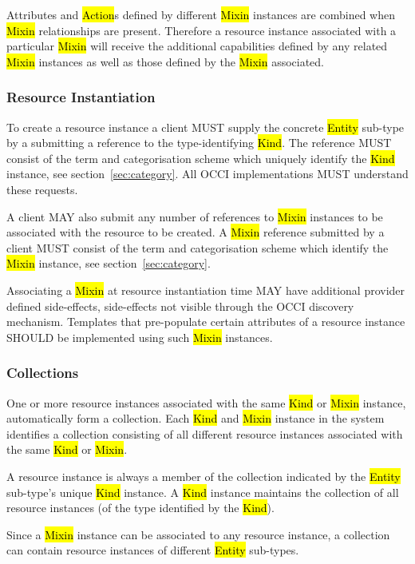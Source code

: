 \documentclass[10pt,a4paper]{article}
\begin{document}
Attributes and \hl{Action}s defined by different \hl{Mixin} instances
are combined when \hl{Mixin} relationships are present. Therefore a
resource instance associated with a particular \hl{Mixin} will receive
the additional capabilities defined by any related \hl{Mixin}
instances as well as those defined by the \hl{Mixin} associated.

\subsubsection{Resource Instantiation}
\label{sec:instantiation}
To create a resource instance a client MUST supply the concrete
\hl{Entity} sub-type by a submitting a reference to the
type-identifying \hl{Kind}.  The reference MUST consist of the term
and categorisation scheme which uniquely identify the \hl{Kind}
instance, see section~\ref{sec:category}.  All OCCI implementations
MUST understand these requests.

A client MAY also submit any number of references to \hl{Mixin}
instances to be associated with the resource to be created. A
\hl{Mixin} reference submitted by a client MUST consist of the term
and categorisation scheme which identify the \hl{Mixin} instance, see
section~\ref{sec:category}.

Associating a \hl{Mixin} at resource instantiation time MAY have
additional provider defined side-effects, side-effects not visible
through the OCCI discovery mechanism. Templates that pre-populate
certain attributes of a resource instance SHOULD be implemented using
such \hl{Mixin} instances.

\subsubsection{Collections}
\label{sec:collection}
One or more resource instances associated with the same \hl{Kind} or
\hl{Mixin} instance, automatically form a collection.  Each \hl{Kind}
and \hl{Mixin} instance in the system identifies a collection
consisting of all different resource instances associated with the same
\hl{Kind} or \hl{Mixin}.

A resource instance is always a member of the collection indicated by
the \hl{Entity} sub-type's unique \hl{Kind} instance. A \hl{Kind}
instance maintains the collection of all resource instances (of the
type identified by the \hl{Kind}).

Since a \hl{Mixin} instance can be associated to any resource
instance, a collection can contain resource instances of different
\hl{Entity} sub-types.
\end{document}
